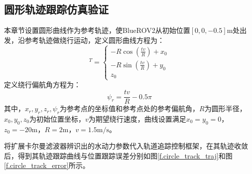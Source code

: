 \subsection{圆形轨迹跟踪仿真验证}

本章节设置圆形曲线作为参考轨迹，使BlueROV2从初始位置$[0,0,-0.5]\text{m}$处出发，沿参考轨迹做绕行运动，定义圆形曲线方程为：
\begin{equation}
    [x_r, y_r, z_r]^T = \left\{\begin{matrix}
  -R\cos(\frac{tv}{R}) + x_0 \\
  -R\sin(\frac{tv}{R}) + y_0 \\
  z_0 
\end{matrix}\right.
\end{equation}
定义绕行偏航角方程为：
\begin{equation}
    \psi_r = \frac{tv}{R}-0.5\pi
\end{equation}
其中，$x_r,y_r, z_r,\psi_r$为参考点的坐标值和参考点处的参考偏航角，$R$为圆形半径，$x_0,y_0,z_0$为初始位置坐标，$v$为期望绕行速度，曲线设置满足$x_0=y_0=0$，$z_0=-20\text{m}$，$R=2\text{m}$，$v=1.5\text{m/s}$。

将扩展卡尔曼滤波器辨识出的水动力参数代入轨道追踪控制框架，在其轨迹收敛后，得到其轨迹跟踪曲线与位置跟踪误差分别如图\ref{f.circle_track_traj}和图\ref{f.circle_track_error}所示。

